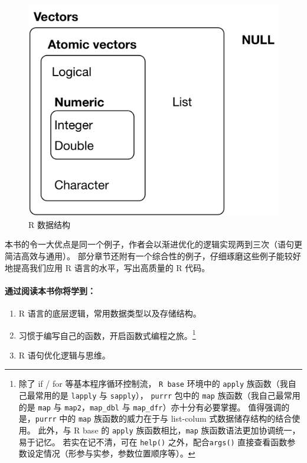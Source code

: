 \documentclass[11pt,hyperref]{ctexart}
\let\oldparagraph\paragraph
\renewcommand{\paragraph}[1]{\oldparagraph{#1}\mbox{}}
\begin{document}
\begin{figure}
\centering
\includegraphics{images/data-structures.png}
\caption{R 数据结构}
\end{figure}

本书的令一大优点是同一个例子，作者会以渐进优化的逻辑实现两到三次（语句更简洁高效与通用）。
部分章节还附有一个综合性的例子，仔细琢磨这些例子能较好地提高我们应用 R
语言的水平，写出高质量的 R 代码。

\hypertarget{ux901aux8fc7ux9605ux8bfbux672cux4e66ux4f60ux5c06ux5b66ux5230}{%
\paragraph{通过阅读本书你将学到：}\label{ux901aux8fc7ux9605ux8bfbux672cux4e66ux4f60ux5c06ux5b66ux5230}}

\begin{enumerate}
\def\labelenumi{\arabic{enumi}.}
\item
  R 语言的底层逻辑，常用数据类型以及存储结构。
\item
  习惯于编写自己的函数，开启函数式编程之旅。\footnote{除了 if / for
    等基本程序循环控制流， \texttt{R\ base} 环境中的 \texttt{apply}
    族函数（我自己最常用的是 \texttt{lapply} 与 \texttt{sapply}），
    \texttt{purrr} 包中的 \texttt{map} 族函数（我自己最常用的是
    \texttt{map} 与 \texttt{map2}，\texttt{map\_dbl} 与
    \texttt{map\_dfr}）亦十分有必要掌握。 值得强调的是，\texttt{purrr}
    中的 \texttt{map} 族函数的威力在于与 list-colum
    式数据储存结构的结合使用。 此外，与 R base 的 \texttt{apply}
    族函数相比，\texttt{map} 族函数语法更加协调统一，易于记忆。
    若实在记不清，可在 \texttt{help()} 之外，配合\texttt{args()}
    直接查看函数参数设定情况（形参与实参，参数位置顺序等）。}
\item
  R 语句优化逻辑与思维。
\end{enumerate}
\end{document}
